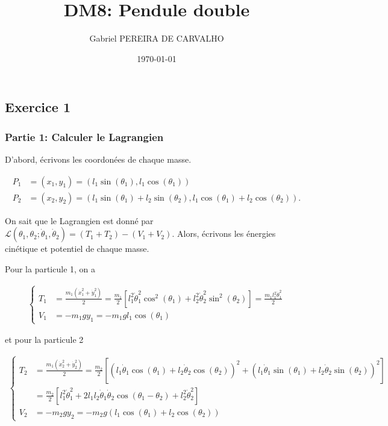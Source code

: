 \documentclass[french]{article}
\begin{document}
	\title{DM8: Pendule double}
	\author{Gabriel PEREIRA DE CARVALHO}
	\date{\today}
	
	\maketitle
	
	\subsection*{Exercice 1}
	
	\subsubsection*{Partie 1: Calculer le Lagrangien}
	
	D'abord, écrivons les coordonées de chaque masse.
	
	\begin{align}
		P_1 &= (x_1, y_1) = (l_1 \sin(\theta_1), l_1 \cos(\theta_1))\\
		P_2 &= (x_2, y_2) = (l_1 \sin(\theta_1) + l_2 \sin(\theta_2), l_1 \cos(\theta_1) + l_2 \cos(\theta_2)).
	\end{align}
	
	On sait que le Lagrangien est donné par $\mathcal{L}(\theta_1, \theta_2; \dot{\theta}_1, \dot{\theta}_2) = (T_1 + T_2) - (V_1 + V_2)$. Alors, écrivons les énergies cinétique et potentiel de chaque masse.
	
	Pour la particule 1, on a
	
	\begin{align}
		\begin{cases}
		T_1 &= \frac{m_1(\dot{x}_1^2 + \dot{y}_1^2)}{2} = \frac{m_1}{2}\left[l_1^2 \dot{\theta}_1^2 \cos^2(\theta_1) + l_2^2 \dot{\theta}_2^2 \sin^2(\theta_2)\right] = \frac{m_1 l_1^2 \dot{\theta}_1^2}{2}\\
		V_1 &= -m_1gy_1 = -m_1gl_1\cos(\theta_1)
		\end{cases}
	\end{align}
	
	et pour la particule 2
	
	\begin{align}
		\begin{cases}
		T_2 &= \frac{m_1(\dot{x}_2^2 + \dot{y}_2^2)}{2} = \frac{m_2}{2} \left[ (l_1\dot{\theta}_1\cos(\theta_1) + l_2\dot{\theta}_2\cos(\theta_2))^2 + (l_1\dot{\theta}_1\sin(\theta_1) + l_2 \dot{\theta}_2 \sin(\theta_2))^2\right] \\
		&=  \frac{m_2}{2} \left[ l_1^2\dot{\theta}_1^2 + 2l_1l_2\dot{\theta}_1\dot{\theta}_2\cos(\theta_1 - \theta_2) + l_2^2 \dot{\theta}_2^2 \right] \\
		V_2 &= -m_2gy_2 = -m_2g(l_1\cos(\theta_1) + l_2\cos(\theta_2))
		\end{cases}
	\end{align}
	
\end{document}
